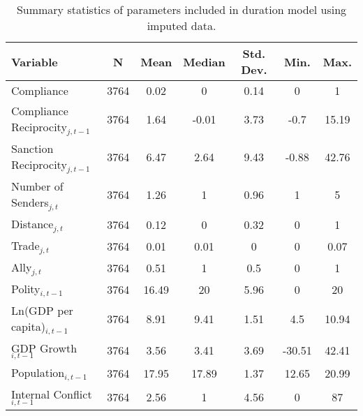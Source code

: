 \begin{table}[ht]
\centering
{\normalsize
\begin{tabular}{lcccccc}
 Variable & N & Mean & Median & Std. Dev. & Min. & Max. \\ 
  \hline
\hline
Compliance & 3764 & 0.02 & 0 & 0.14 & 0 & 1 \\ 
  Compliance Reciprocity$_{j,t-1}$ & 3764 & 1.64 & -0.01 & 3.73 & -0.7 & 15.19 \\ 
  Sanction Reciprocity$_{j,t-1}$ & 3764 & 6.47 & 2.64 & 9.43 & -0.88 & 42.76 \\ 
  Number of Senders$_{j,t}$ & 3764 & 1.26 & 1 & 0.96 & 1 & 5 \\ 
  Distance$_{j,t}$ & 3764 & 0.12 & 0 & 0.32 & 0 & 1 \\ 
  Trade$_{j,t}$ & 3764 & 0.01 & 0.01 & 0 & 0 & 0.07 \\ 
  Ally$_{j,t}$ & 3764 & 0.51 & 1 & 0.5 & 0 & 1 \\ 
  Polity$_{i,t-1}$ & 3764 & 16.49 & 20 & 5.96 & 0 & 20 \\ 
  Ln(GDP per capita)$_{i,t-1}$ & 3764 & 8.91 & 9.41 & 1.51 & 4.5 & 10.94 \\ 
  GDP Growth$_{i,t-1}$ & 3764 & 3.56 & 3.41 & 3.69 & -30.51 & 42.41 \\ 
  Population$_{i,t-1}$ & 3764 & 17.95 & 17.89 & 1.37 & 12.65 & 20.99 \\ 
  Internal Conflict$_{i,t-1}$ & 3764 & 2.56 & 1 & 4.56 & 0 & 87 \\ 
   \hline
\hline
\end{tabular}
}
\caption{Summary statistics of parameters included in duration model using imputed data.} 
\label{tab:summImp}
\end{table}
